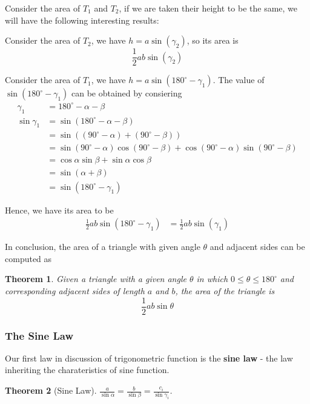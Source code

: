 \documentclass[12pt]{article}
\newtheorem*{theorem}{Theorem}
\begin{document}
    Consider the area of $T_1$ and $T_2$, if we are taken their height to be the same, we will have the following interesting results:

    Consider the area of $T_2$, we have $h=a\sin(\gamma_2)$, so its area is $$\frac{1}{2}ab\sin(\gamma_2)$$

    Consider the area of $T_1$, we have $h=a\sin(180^\circ - \gamma_1)$. The value of $\sin(180^\circ - \gamma_1)$ can be obtained by consiering \begin{align*}
        \gamma_1 &= 180^\circ - \alpha - \beta\\
        \sin{\gamma_1}&=\sin(180^\circ - \alpha - \beta)\\
        &=\sin((90^\circ - \alpha) + (90^\circ - \beta))\\
        &=\sin(90^\circ - \alpha)\cos(90^\circ - \beta)+ \cos(90^\circ - \alpha)\sin(90^\circ - \beta)\\
        &=\cos{\alpha}\sin{\beta}+\sin{\alpha}\cos{\beta}\\
        &=\sin(\alpha+\beta)\\
        &=\sin(180^\circ - \gamma_1)
    \end{align*}

    Hence, we have its area to be \begin{align*}
        \frac{1}{2}ab\sin(180^\circ - \gamma_1)&=\frac{1}{2}ab\sin(\gamma_1)
    \end{align*}

    In conclusion, the area of a triangle with given angle $\theta$ and adjacent sides can be computed as 

    \begin{theorem}
        Given a triangle with a given angle $\theta$ in which $0\leq \theta\leq 180^\circ$ and corresponding adjacent sides of length $a$ and $b$, the area of the triangle is $$\frac{1}{2}ab\sin{\theta}$$
    \end{theorem}

    \subsubsection*{The Sine Law}

    Our first law in discussion of trigonometric function is the \textbf{sine law} - the law inheriting the charateristics of sine function.

    \begin{theorem}[Sine Law]
        $\displaystyle \frac{a}{\sin{\alpha}}=\frac{b}{\sin{\beta}}=\frac{c_i}{\sin{\gamma_i}}$.
    \end{theorem}
\end{document}
